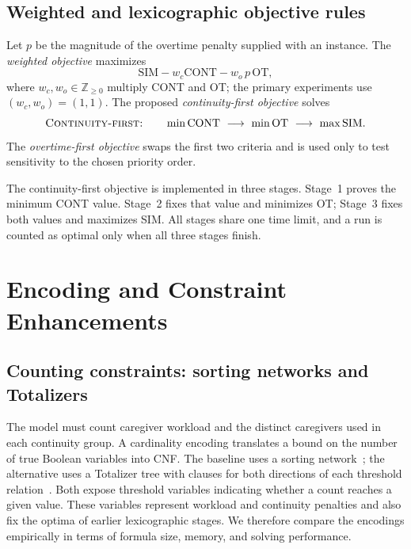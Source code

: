 \documentclass[sigconf,nonacm]{acmart}
\begin{document}
\subsection{Weighted and lexicographic objective rules}

Let $p$ be the magnitude of the overtime penalty supplied with an instance.
The \emph{weighted objective} maximizes
\begin{equation}
  \mathrm{SIM}-w_c\mathrm{CONT}-w_o\,p\,\mathrm{OT},
  \label{eq:weighted}
\end{equation}
where $w_c,w_o\in\mathbb Z_{\geq0}$ multiply CONT and OT; the primary experiments
use $(w_c,w_o)=(1,1)$.  The proposed \emph{continuity-first objective} solves
\begin{equation}
  \textsc{Continuity-first:}\qquad
  \min\mathrm{CONT}\ \longrightarrow\ \min\mathrm{OT}\
  \longrightarrow\ \max\mathrm{SIM}.
  \label{eq:lex-cos}
\end{equation}
The \emph{overtime-first objective} swaps the first two criteria and is used
only to test sensitivity to the chosen priority order.

The continuity-first objective is implemented in three stages.  Stage~1 proves
the minimum CONT value.  Stage~2 fixes that value and minimizes OT; Stage~3
fixes both values and maximizes SIM.  All stages share one time limit, and a run
is counted as optimal only when all three stages finish.

\section{Encoding and Constraint Enhancements}
\label{sec:encoding}

\subsection{Counting constraints: sorting networks and Totalizers}

The model must count caregiver workload and the distinct caregivers used in
each continuity group.  A cardinality encoding translates a bound on the number
of true Boolean variables into CNF.  The baseline uses a sorting
network~\cite{AsinEtAl2011}; the alternative uses a Totalizer tree with clauses
for both directions of each threshold relation~\cite{BailleuxBoufkhad2003,BailleuxBoufkhad2004}.
Both expose threshold
variables indicating whether a count reaches a given value.  These variables
represent workload and continuity penalties and also fix the optima of earlier
lexicographic stages.  We therefore compare the encodings empirically in terms
of formula size, memory, and solving performance.
\end{document}
